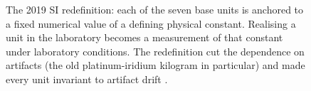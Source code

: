 \begin{figure}[htbp]
\caption[SI 2019: base units and defining constants]{The 2019 SI
redefinition: each of the seven base units is anchored to a fixed
numerical value of a defining physical constant. Realising a unit
in the laboratory becomes a measurement of that constant under
laboratory conditions. The redefinition cut the dependence on
artifacts (the old platinum-iridium kilogram in particular) and
made every unit invariant to artifact drift \cite{std:bipm-si2019}.}
\label{fig:vol01:ch02:si-constants}
\end{figure}
